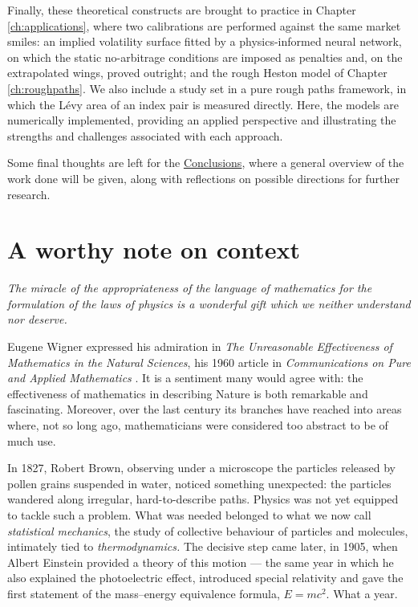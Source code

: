 Finally, these theoretical constructs are brought to practice in Chapter \ref{ch:applications}, where two calibrations are performed against the same market smiles: an implied volatility surface fitted by a physics-informed neural network, on which the static no-arbitrage conditions are imposed as penalties and, on the extrapolated wings, proved outright; and the rough Heston model of Chapter \ref{ch:roughpaths}. We also include a study set in a pure rough paths framework, in which the L\'evy area of an index pair is measured directly. Here, the models are numerically implemented, providing an applied perspective and illustrating the strengths and challenges associated with each approach.

Some final thoughts are left for the \hyperref[ch:conclusions]{Conclusions}, where a general overview of the work done will be given, along with reflections on possible directions for further research.


\newpage





\section{A worthy note on context}

\begin{center}
    \centering
    \textit{The miracle of the appropriateness of the language of mathematics for the formulation of the laws of physics is a wonderful gift which we neither understand nor deserve.}
\end{center}

Eugene Wigner expressed his admiration in \textit{The Unreasonable Effectiveness of Mathematics in the Natural Sciences}, his 1960 article in \textit{Communications on Pure and Applied Mathematics} \cite{wigner1960}. It is a sentiment many would agree with: the effectiveness of mathematics in describing Nature is both remarkable and fascinating. Moreover, over the last century its branches have reached into areas where, not so long ago, mathematicians were considered too abstract to be of much use.

In 1827, Robert Brown, observing under a microscope the particles released by pollen grains suspended in water, noticed something unexpected: the particles wandered along irregular, hard-to-describe paths. Physics was not yet equipped to tackle such a problem. What was needed belonged to what we now call \textit{statistical mechanics}, the study of collective behaviour of particles and molecules, intimately tied to \textit{thermodynamics.} The decisive step came later, in 1905, when Albert Einstein provided a theory of this motion --- the same year in which he also explained the photoelectric effect, introduced special relativity and gave the first statement of the mass--energy equivalence formula, $E=mc^2$. What a year.

